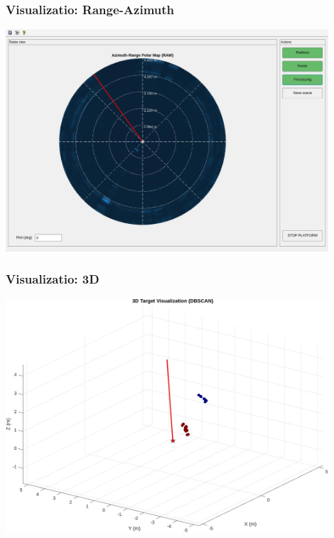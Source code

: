\documentclass[aspectratio=43]{beamer}
\begin{document}
\begin{frame}[fragile]
  \frametitle{Visualizatio: Range-Azimuth}
  \begin{center}
    \includegraphics[width=0.9\textwidth]{../img/vis_range_azimuth.jpg}
  \end{center}
\end{frame}

\begin{frame}[fragile]
  \frametitle{Visualizatio: 3D}
  \begin{center}
    \includegraphics[width=0.9\textwidth]{../img/vis_3d.jpg}
  \end{center}
\end{frame}
\end{document}
